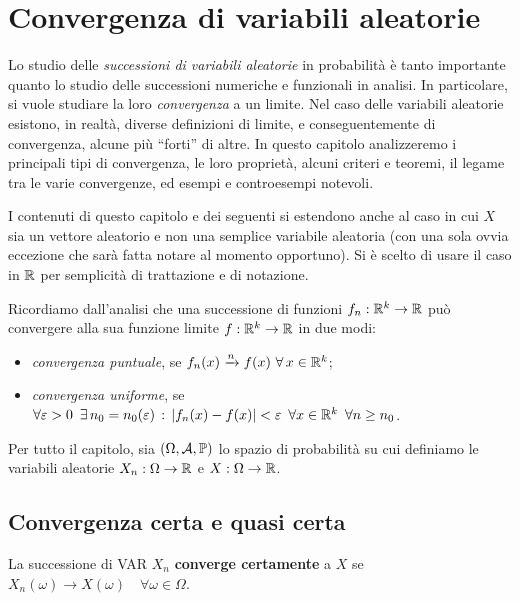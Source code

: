 \section{Convergenza di variabili aleatorie}
Lo studio delle \emph{successioni di variabili aleatorie} in probabilità è tanto importante quanto lo studio delle successioni numeriche e funzionali in analisi.
In particolare, si vuole studiare la loro \emph{convergenza} a un limite.
Nel caso delle variabili aleatorie esistono, in realtà, diverse definizioni di limite, e conseguentemente di convergenza, alcune più ``forti'' di altre.
In questo capitolo analizzeremo i principali tipi di convergenza, le loro proprietà, alcuni criteri e teoremi, il legame tra le varie convergenze, ed esempi e controesempi notevoli.

\begin{nb}
	I contenuti di questo capitolo e dei seguenti si estendono anche al caso in cui $X$ sia un vettore aleatorio e non una semplice variabile aleatoria (con una sola ovvia eccezione che sarà fatta notare al momento opportuno). Si è scelto di usare il caso in $\mathbb R$ per semplicità di trattazione e di notazione.
\end{nb}

\medskip
Ricordiamo dall'analisi che una successione di funzioni $f_n: \mathbb R^k \to \mathbb R$ può convergere alla sua funzione limite $f: \mathbb R^k \to \mathbb R$ in due modi:
\begin{itemize}
    \item \textit{convergenza puntuale}, se $f_n(x) \xrightarrow{n} f(x) \ \forall \, x \in \mathbb R^k$;
    \item \textit{convergenza uniforme}, se $\forall \varepsilon > 0 \enspace \exists \, n_0 = n_0(\varepsilon) \, : \, |f_n(x) - f(x)| < \varepsilon \enspace \forall x \in \mathbb R^k \enspace \forall n \ge n_0$.
\end{itemize}

Per tutto il capitolo, sia $(\Omega, \mathcal A, \mathbb P)$ lo spazio di probabilità su cui definiamo le variabili aleatorie $X_n: \Omega \to \mathbb R$ e $X: \Omega \to \mathbb R$.

\subsection{Convergenza certa e quasi certa}
\begin{defn}
    La successione di VAR $X_n$ \textbf{converge certamente} a $X$
    se $X_n(\omega) \to X(\omega) \quad \forall \omega \in \Omega$.
\end{defn}


